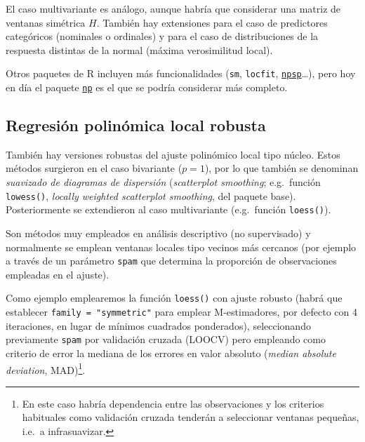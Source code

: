 \documentclass[
  spanish,
]{book}
\theoremstyle{break}
\theoremstyle{definition}
\theoremstyle{definition}
\theoremstyle{definition}
\theoremstyle{definition}
\theoremstyle{remark}
\begin{document}
El caso multivariante es análogo, aunque habría que considerar una matriz de ventanas simétrica \(H\). También hay extensiones para el caso de predictores categóricos (nominales o ordinales) y para el caso de distribuciones de la respuesta distintas de la normal (máxima verosimilitud local).

Otros paquetes de R incluyen más funcionalidades (\texttt{sm}, \texttt{locfit}, \href{https://rubenfcasal.github.io/npsp}{\texttt{npsp}}\ldots), pero hoy en día el paquete \href{https://github.com/JeffreyRacine/R-Package-np}{\texttt{np}} es el que se podría considerar más completo.

\hypertarget{regresiuxf3n-polinuxf3mica-local-robusta}{%
\subsection{Regresión polinómica local robusta}\label{regresiuxf3n-polinuxf3mica-local-robusta}}

También hay versiones robustas del ajuste polinómico local tipo núcleo.
Estos métodos surgieron en el caso bivariante (\(p=1\)), por lo que también se denominan \emph{suavizado de diagramas de dispersión} (\emph{scatterplot smoothing}; e.g.~función \texttt{lowess()}, \emph{locally weighted scatterplot smoothing}, del paquete base).
Posteriormente se extendieron al caso multivariante (e.g.~función \texttt{loess()}).

Son métodos muy empleados en análisis descriptivo (no supervisado) y normalmente se emplean ventanas locales tipo vecinos más cercanos (por ejemplo a través de un parámetro \texttt{spam} que determina la proporción de observaciones empleadas en el ajuste).

Como ejemplo emplearemos la función \texttt{loess()} con ajuste robusto (habrá que establecer \texttt{family\ =\ "symmetric"} para emplear M-estimadores, por defecto con 4 iteraciones, en lugar de mínimos cuadrados ponderados), seleccionando previamente \texttt{spam} por validación cruzada (LOOCV) pero empleando como criterio de error la mediana de los errores en valor absoluto (\emph{median absolute deviation}, MAD)\footnote{En este caso habría dependencia entre las observaciones y los criterios habituales como validación cruzada tenderán a seleccionar ventanas pequeñas, i.e.~a infrasuavizar.}.
\end{document}
